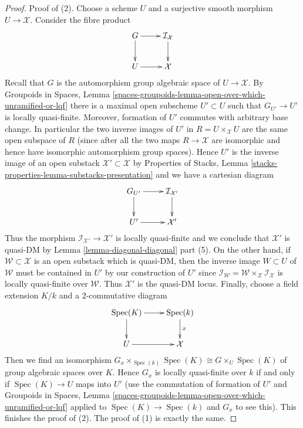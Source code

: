 \documentclass[10pt,a4paper]{amsart}
\theoremstyle{plain}
\theoremstyle{definition}
\theoremstyle{remark}
\numberwithin{equation}{subsection}
\def\Spec{\mathop{\mathrm{Spec}}}
\begin{document}
\begin{proof}
Proof of (2). Choose a scheme $U$ and a surjective smooth morphism
$U \to \mathcal{X}$. Consider the fibre product
$$
\xymatrix{
G \ar[r] \ar[d] & \mathcal{I}_\mathcal{X} \ar[d] \\
U \ar[r] & \mathcal{X}
}
$$
Recall that $G$ is the automorphism group algebraic space of
$U \to \mathcal{X}$. By Groupoids in Spaces, Lemma
\ref{spaces-groupoids-lemma-open-over-which-unramified-or-lqf}
there is a maximal open subscheme $U' \subset U$
such that $G_{U'} \to U'$ is locally quasi-finite.
Moreover, formation of $U'$ commutes with arbitrary
base change. In particular the two inverse images of $U'$
in $R = U \times_\mathcal{X} U$ are the same open subspace of $R$
(since after all the two maps $R \to \mathcal{X}$ are isomorphic
and hence have isomorphic automorphism group spaces).
Hence $U'$ is the inverse image of an open substack
$\mathcal{X}' \subset \mathcal{X}$ by
Properties of Stacks, Lemma
\ref{stacks-properties-lemma-substacks-presentation}
and we have a cartesian diagram
$$
\xymatrix{
G_{U'} \ar[r] \ar[d] & \mathcal{I}_{\mathcal{X}'} \ar[d] \\
U' \ar[r] & \mathcal{X}'
}
$$
Thus the morphism $\mathcal{I}_{\mathcal{X}'} \to \mathcal{X}'$
is locally quasi-finite and we conclude that
$\mathcal{X}'$ is quasi-DM by Lemma \ref{lemma-diagonal-diagonal}
part (5). On the other hand, if $\mathcal{W} \subset \mathcal{X}$
is an open substack which is quasi-DM, then the inverse image
$W \subset U$ of $\mathcal{W}$ must be contained in $U'$ by our
construction of $U'$ since
$\mathcal{I}_\mathcal{W} =
\mathcal{W} \times_\mathcal{X} \mathcal{I}_\mathcal{X}$
is locally quasi-finite over $\mathcal{W}$.
Thus $\mathcal{X}'$ is the quasi-DM locus.
Finally, choose a field extension $K/k$ and a $2$-commutative
diagram
$$
\xymatrix{
\Spec(K) \ar[r] \ar[d] & \Spec(k) \ar[d]^x \\
U \ar[r] & \mathcal{X}
}
$$
Then we find an isomorphism
$G_x \times_{\Spec(k)} \Spec(K) \cong G \times_U \Spec(K)$
of group algebraic spaces over $K$. Hence $G_x$ is locally quasi-finite
over $k$ if and only if $\Spec(K) \to U$ maps into $U'$
(use the commutation of formation of $U'$ and
Groupoids in Spaces, Lemma
\ref{spaces-groupoids-lemma-open-over-which-unramified-or-lqf}
applied to $\Spec(K) \to \Spec(k)$ and $G_x$ to see this).
This finishes the proof of (2). The proof of (1) is
exactly the same.
\end{proof}
\end{document}
